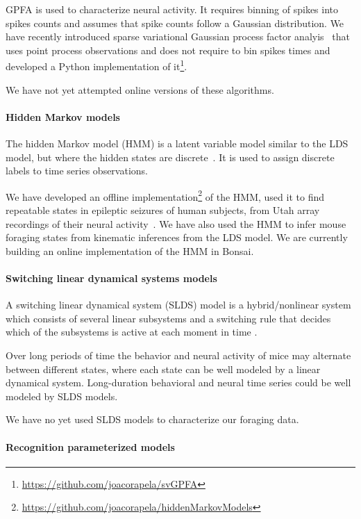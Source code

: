 GPFA is used to characterize neural activity. It requires binning of spikes
into spikes counts and assumes that spike counts follow a Gaussian
distribution. We have recently introduced sparse variational Gaussian process
factor analyis~\citep[svGPFA,][]{dunckerAndSahani18} that uses point process observations
and does not require to bin spikes times and developed a Python implementation
of it\footnote{\url{https://github.com/joacorapela/svGPFA}}.

We have not yet attempted online versions of these algorithms.

\paragraph{Hidden Markov models}

The hidden Markov model (HMM) is a latent variable model similar to the LDS
model, but where the hidden states are discrete~\citep[][Chapter 13]{bishop06}. It is
used to assign discrete labels to time series observations.

We have developed an offline
implementation\footnote{\url{https://github.com/joacorapela/hiddenMarkovModels}}
of the HMM, used it to find repeatable states in epileptic seizures of human
subjects, from Utah array recordings of their neural
activity~\citep{rapelaAndTodorov19-epilepsy-hmm}. We have also used the HMM to
infer mouse foraging states from kinematic inferences from the LDS model. We
are currently building an online implementation of the HMM in Bonsai.

\paragraph{Switching linear dynamical systems models}

A switching linear dynamical system (SLDS) model is a hybrid/nonlinear system which
consists of several linear subsystems and a switching rule that decides which
of the subsystems is active at each moment in time \citep[Section
18.6]{murphy12}.

Over long periods of time the behavior and neural activity of mice may
alternate between different states, where each state can be well modeled by a
linear dynamical system. Long-duration behavioral and neural time series could
be well modeled by SLDS models.

We have no yet used SLDS models to characterize our foraging data.

\paragraph{Recognition parameterized models}


